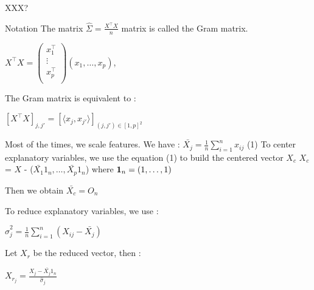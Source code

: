 \documentclass[unknownkeysallowed]{beamer}
\begin{document}
\begin{frame}{XXX?} %
\begin{block}{Notation}
The matrix $\hat\Sigma=\frac{X^{\top}X}{n}$ matrix is called the Gram matrix.
\begin{center}
    $X^{\top}X=\begin{pmatrix}
   x_{1}^{\top}  \\
   \vdots   \\
   x_{p}^{\top}  \\
\end{pmatrix}(x_{1},\dots, x_{p}) $,
\end{center}
\end{block}

The Gram matrix is equivalent to :
\begin{center}
$[X^{\top}X]_{j,j'}=[\langle x_{j},x_{j'}\rangle]_{(j,j')\in[1,p]^2}$
\end{center}

\rem
Most of the times, we scale features.
\newline
We have : $\bar{X_{j}}=\frac{1}{n} \sum\limits_{i=1}^{n} x_{ij}$ (1)
\newline
 To center explanatory variables, we use the equation (1) to build the centered vector $X_{c}$
\newline
$X_{c}$ =  $X$ - ($\bar{X_{1}}1_n,\dots,\bar{X_{p}}1_n$) where $\mathbf 1_n=(1,\dots,1)$

Then we obtain $\bar{X_{c}}=O_n$

To reduce explanatory variables, we use :
\newline
\begin{center}
$\hat\sigma_{j}^2=\frac{1}{n} \sum\limits_{i=1}^{n} (X_{ij}-\bar{X_{j}})$
\end{center}
Let $X_r$ be the reduced vector, then :
\newline
\begin{center}
$X_{r_{j}}=\frac{X_{j}-\bar{X_{j}}1_n}{\hat\sigma_{j}}$
\end{center}

\end{frame}
\end{document}
